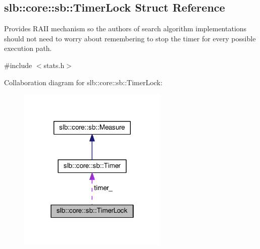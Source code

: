 \hypertarget{structslb_1_1core_1_1sb_1_1TimerLock}{}\subsection{slb\+:\+:core\+:\+:sb\+:\+:Timer\+Lock Struct Reference}
\label{structslb_1_1core_1_1sb_1_1TimerLock}


Provides R\+A\+II mechanism so the authors of search algorithm implementations should not need to worry about remembering to stop the timer for every possible execution path.  




{\ttfamily \#include $<$stats.\+h$>$}



Collaboration diagram for slb\+:\+:core\+:\+:sb\+:\+:Timer\+Lock\+:\nopagebreak
\begin{figure}[H]
\begin{center}
\leavevmode
\includegraphics[width=202pt]{structslb_1_1core_1_1sb_1_1TimerLock__coll__graph}
\end{center}
\end{figure}
